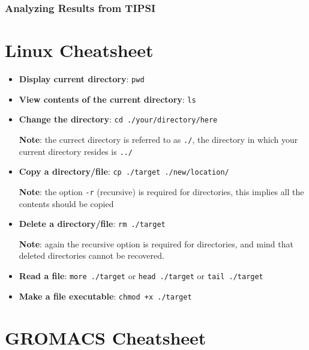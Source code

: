 \documentclass[]{article}
\begin{document}
\subsubsection*{Analyzing Results from TIPSI}



\newpage

\appendix
\section*{Linux Cheatsheet}
\setlength\parindent{0pt}

\begin{itemize}
\item \textbf{Display current directory}: \texttt{pwd}

\item \textbf{View contents of the current directory}: \texttt{ls}

\item \textbf{Change the directory}: \texttt{cd ./your/directory/here}

\textbf{Note}: the currect directory is referred to as \texttt{./}, the directory in which your current directory resides is \texttt{../}

\item \textbf{Copy a directory/file}: \texttt{cp ./target ./new/location/}

\textbf{Note}: the option \texttt{-r} (recursive) is required for directories, this implies all the contents should be copied

\item \textbf{Delete a directory/file}: \texttt{rm ./target}

\textbf{Note}: again the recursive option is required for directories, and mind that deleted directories cannot be recovered.

\item \textbf{Read a file}: \texttt{more ./target} or \texttt{head ./target} or \texttt{tail ./target}

\item \textbf{Make a file executable}: \texttt{chmod +x ./target}
\end{itemize}

\newpage
\section*{GROMACS Cheatsheet}
\end{document}
